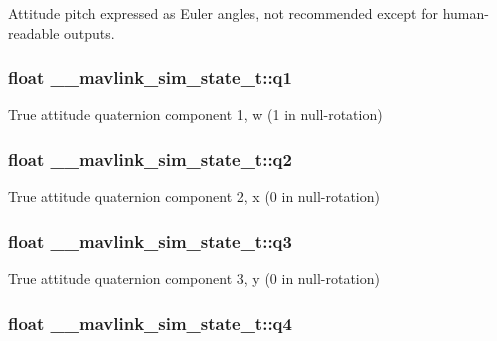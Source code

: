 Attitude pitch expressed as Euler angles, not recommended except for human-\/readable outputs. 

\hypertarget{struct____mavlink__sim__state__t_a9dfbea689e2c7698c3a261f6802c8e1f}{
\subsubsection[{q1}]{\setlength{\rightskip}{0pt plus 5cm}float \+\_\+\+\_\+mavlink\+\_\+sim\+\_\+state\+\_\+t\+::q1}}\label{struct____mavlink__sim__state__t_a9dfbea689e2c7698c3a261f6802c8e1f}


True attitude quaternion component 1, w (1 in null-\/rotation) 

\hypertarget{struct____mavlink__sim__state__t_a1505c15afe799f4f900ad53c8d55b40c}{
\subsubsection[{q2}]{\setlength{\rightskip}{0pt plus 5cm}float \+\_\+\+\_\+mavlink\+\_\+sim\+\_\+state\+\_\+t\+::q2}}\label{struct____mavlink__sim__state__t_a1505c15afe799f4f900ad53c8d55b40c}


True attitude quaternion component 2, x (0 in null-\/rotation) 

\hypertarget{struct____mavlink__sim__state__t_a6b8cee23b1ef3cdbd9b501d7288b9a7c}{
\subsubsection[{q3}]{\setlength{\rightskip}{0pt plus 5cm}float \+\_\+\+\_\+mavlink\+\_\+sim\+\_\+state\+\_\+t\+::q3}}\label{struct____mavlink__sim__state__t_a6b8cee23b1ef3cdbd9b501d7288b9a7c}


True attitude quaternion component 3, y (0 in null-\/rotation) 

\hypertarget{struct____mavlink__sim__state__t_ae16cb79acbe95c51bb3a341d0d2ffda1}{
\subsubsection[{q4}]{\setlength{\rightskip}{0pt plus 5cm}float \+\_\+\+\_\+mavlink\+\_\+sim\+\_\+state\+\_\+t\+::q4}}\label{struct____mavlink__sim__state__t_ae16cb79acbe95c51bb3a341d0d2ffda1}


